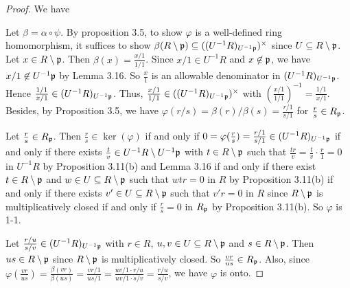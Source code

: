 \begin{proof}
    We have 
    \begin{center}
    \end{center}
    Let $\beta = \alpha \circ \psi$. By proposition 3.5, to show $\varphi$ is a well-defined ring homomorphism, it suffices to show $\beta(R \setminus \mathfrak{p}) \subseteq ((U^{-1}R)_{U^{-1}\mathfrak{p}})^{\times}$ since $U \subseteq R \setminus \mathfrak{p}$. Let $x \in R \setminus \mathfrak{p}$. Then $\beta(x) = \frac{x/1}{1/1}$. Since $x/1 \in U^{-1}R$ and $x \not \in \mathfrak{p}$, we have $x/1 \not \in U^{-1}\mathfrak{p}$ by Lemma 3.16. So $\frac{x}{1}$ is an allowable denominator in $(U^{-1}R)_{U^{-1}\mathfrak{p}}$. Hence $\frac{1/1}{x/1} \in (U^{-1}R)_{U^{-1}\mathfrak{p}}$. Thus, $\frac{x/1}{1/1} \in ((U^{-1}R)_{U^{-1}\mathfrak{p}})^{\times}$ with $(\frac{x/1}{1/1})^{-1} = \frac{1/1}{x/1}$. Besides, by Proposition 3.5, we have $\varphi(r/s) = \beta(r)/\beta(s) = \frac{r/1}{s/1}$ for $\frac{r}{s} \in R_{\mathfrak{p}}$. \par 
    Let $\frac{r}{s} \in R_{\mathfrak{p}}$. Then $\frac{r}{s} \in \ker(\varphi)$ if and only if $0 = \varphi(\frac{r}{s}) = \frac{r/1}{s/1} \in (U^{-1}R)_{U^{-1}\mathfrak{p}}$ if and only if there exists $\frac{t}{v} \in U^{-1}R \setminus U^{-1}\mathfrak{p}$ with $t \in R \setminus \mathfrak{p}$ such that $\frac{tr}{v} = \frac{t}{v} \cdot \frac{r}{1} = 0$ in $U^{-1}R$ by Proposition 3.11(b) and Lemma 3.16 if and only if there exist $t \in R \setminus \mathfrak{p}$ and $w \in U \subseteq R \setminus \mathfrak{p}$ such that $wtr = 0$ in $R$ by Proposition 3.11(b) if and only if there exists $v' \in U \subseteq R \setminus \mathfrak{p}$ such that $v'r = 0$ in $R$ since $R \setminus \mathfrak{p}$ is multiplicatively closed if and only if $\frac{r}{s} = 0$ in $R_{\mathfrak{p}}$ by Proposition 3.11(b). So $\varphi$ is 1-1. \par 
    Let $\frac{r/u}{s/v} \in (U^{-1}R)_{U^{-1}\mathfrak{p}}$ with $r \in R$, $u,v \in U \subseteq R \setminus \mathfrak{p}$ and $s \in R \setminus \mathfrak{p}$. Then $us \in R \setminus \mathfrak{p}$ since $R \setminus \mathfrak{p}$ is multiplicatively closed. So $\frac{vr}{us} \in R_{\mathfrak{p}}$. Also, since $\varphi(\frac{vr}{us}) = \frac{\beta(vr)}{\beta(us)} = \frac{vr/1}{us/1} = \frac{uv/1 \cdot r/u}{uv/1 \cdot s/v} = \frac{r/u}{s/v}$, we have $\varphi$ is onto. 
\end{proof}

